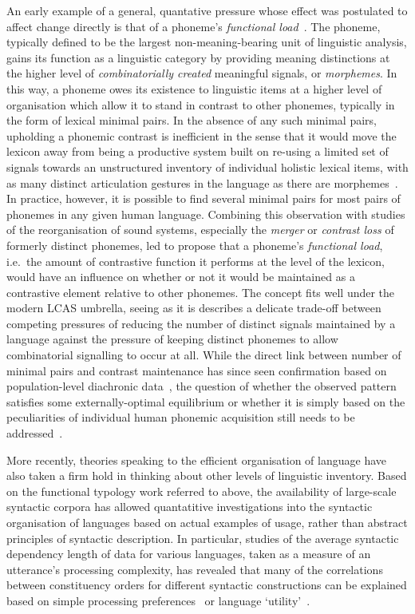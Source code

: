 An early example of a general, quantative pressure whose effect was postulated to affect change directly is that of a phoneme's \emph{functional load}~\citep{Martinet1955}. The phoneme, typically defined to be the largest non-meaning-bearing unit of linguistic analysis, gains its function as a linguistic category by providing meaning distinctions at the higher level of \emph{combinatorially created} meaningful signals, or \emph{morphemes}. In this way, a phoneme owes its existence to linguistic items at a higher level of organisation which allow it to stand in contrast to other phonemes, typically in the form of lexical minimal pairs. In the absence of any such minimal pairs, upholding a phonemic contrast is inefficient in the sense that it would move the lexicon away from being a productive system built on re-using a limited set of signals towards an unstructured inventory of individual holistic lexical items, with as many distinct articulation gestures in the language as there are morphemes~\citep{Spike2017}.
In practice, however, it is possible to find several minimal pairs for most pairs of phonemes in any given human language. Combining this observation with studies of the reorganisation of sound systems, especially the \emph{merger} or \emph{contrast loss} of formerly distinct phonemes, led \citet{Martinet1955} to propose that a phoneme's \emph{functional load}, i.e.~the amount of contrastive function it performs at the level of the lexicon, would have an influence on whether or not it would be maintained as a contrastive element relative to other phonemes. The concept fits well under the modern LCAS umbrella, seeing as it is describes a delicate trade-off between competing pressures of reducing the number of distinct signals maintained by a language against the pressure of keeping distinct phonemes to allow combinatorial signalling to occur at all. While the direct link between number of minimal pairs and contrast maintenance has since seen confirmation based on population-level diachronic data~\citep{Wedel2013short}, the question of whether the observed pattern satisfies some externally-optimal equilibrium or whether it is simply based on the peculiarities of individual human phonemic acquisition still needs to be addressed~\citep{Spike2017}.

More recently, theories speaking to the efficient organisation of language have also taken a firm hold in thinking about other levels of linguistic inventory.
Based on the functional typology work referred to above, the availability of large-scale syntactic corpora has allowed quantatitive investigations into the syntactic organisation of languages based on actual examples of usage, rather than abstract principles of syntactic description. In particular, studies of the average syntactic dependency length of data for various languages, taken as a measure of an utterance's processing complexity, has revealed that many of the correlations between constituency orders for different syntactic constructions can be explained based on simple processing preferences~\citep{Futrell2015} or language `utility'~\citep{Jaeger2010}.

